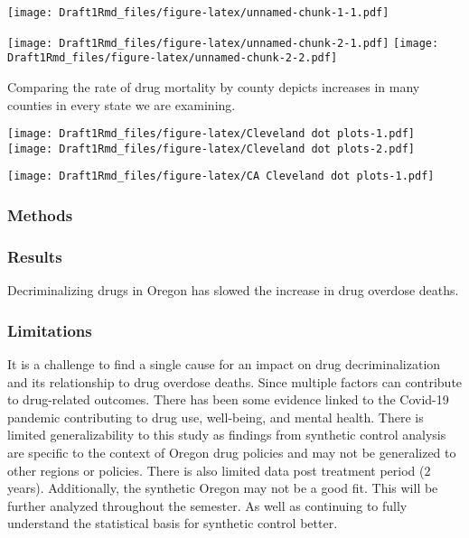 \documentclass[
]{article}
\begin{document}
\texttt{[image: Draft1Rmd\_files/figure-latex/unnamed-chunk-1-1.pdf]}

\texttt{[image: Draft1Rmd\_files/figure-latex/unnamed-chunk-2-1.pdf]}
\texttt{[image: Draft1Rmd\_files/figure-latex/unnamed-chunk-2-2.pdf]}

Comparing the rate of drug mortality by county depicts increases in many
counties in every state we are examining.

\texttt{[image: Draft1Rmd\_files/figure-latex/Cleveland dot plots-1.pdf]}
\texttt{[image: Draft1Rmd\_files/figure-latex/Cleveland dot plots-2.pdf]}

\texttt{[image: Draft1Rmd\_files/figure-latex/CA Cleveland dot plots-1.pdf]}

\hypertarget{methods}{%
\subsubsection{Methods}\label{methods}}

\hypertarget{results}{%
\subsubsection{Results}\label{results}}

Decriminalizing drugs in Oregon has slowed the increase in drug overdose
deaths.

\hypertarget{limitations}{%
\subsubsection{Limitations}\label{limitations}}

It is a challenge to find a single cause for an impact on drug
decriminalization and its relationship to drug overdose deaths. Since
multiple factors can contribute to drug-related outcomes. There has been
some evidence linked to the Covid-19 pandemic contributing to drug use,
well-being, and mental health. There is limited generalizability to this
study as findings from synthetic control analysis are specific to the
context of Oregon drug policies and may not be generalized to other
regions or policies. There is also limited data post treatment period (2
years). Additionally, the synthetic Oregon may not be a good fit. This
will be further analyzed throughout the semester. As well as continuing
to fully understand the statistical basis for synthetic control better.
\end{document}
